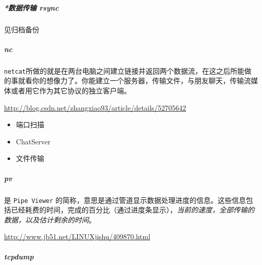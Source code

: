 \documentclass[UTF8,a4paper,12pt]{ctexbook}
\begin{document}
			\subparagraph{*数据传输 rsync}见归档备份
			
			\subparagraph{nc}\verb|netcat|所做的就是在两台电脑之间建立链接并返回两个数据流，在这之后所能做的事就看你的想像力了。你能建立一个服务器，传输文件，与朋友聊天，传输流媒体或者用它作为其它协议的独立客户端。
				
				\url{http://blog.csdn.net/zhangxiao93/article/details/52705642}
				\begin{itemize}[itemindent = 1em]
					\item 端口扫描
					\item ChatServer
					\item 文件传输
				\end{itemize}
				
			\subparagraph{pv}是 \verb|Pipe Viewer| 的简称，意思是通过管道显示数据处理进度的信息。这些信息包括已经耗费的时间，完成的百分比（通过进度条显示），\textit{当前的速度，全部传输的数据，以及估计剩余的时间}。
			
				\url{http://www.jb51.net/LINUXjishu/409870.html}
				
			\subparagraph{tcpdump}
				
\end{document}
